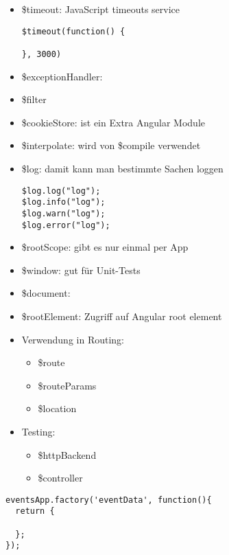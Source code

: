 \begin{itemize}
  \item \$timeout: JavaScript timeouts service
    \begin{verbatim}
$timeout(function() {

}, 3000)
    \end{verbatim}
  \item \$exceptionHandler:
  \item \$filter
  \item \$cookieStore: ist ein Extra Angular Module
  \item \$interpolate: wird von \$compile verwendet
  \item \$log: damit kann man bestimmte Sachen loggen
    \begin{verbatim}
$log.log("log");
$log.info("log");
$log.warn("log");
$log.error("log");
    \end{verbatim}
  \item \$rootScope: gibt es nur einmal per App
  \item \$window: gut für Unit-Tests
  \item \$document:
  \item \$rootElement: Zugriff auf Angular root element
  \item Verwendung in Routing:
    \begin{itemize}
      \item \$route
      \item \$routeParams
      \item \$location
    \end{itemize}
  \item Testing:
    \begin{itemize}
      \item \$httpBackend
      \item \$controller
    \end{itemize}
\end{itemize}


\begin{verbatim}
eventsApp.factory('eventData', function(){
  return {

  };
});

\end{verbatim}


